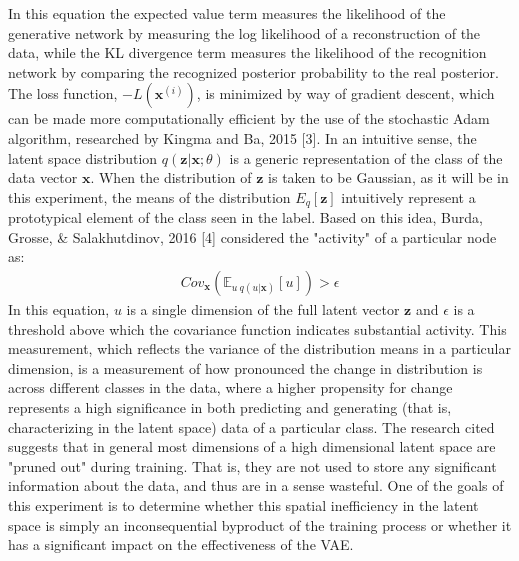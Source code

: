 \documentclass{article} %
\begin{document}
In this equation the expected value term measures the likelihood of the generative network by measuring the log likelihood of a reconstruction of the data, while the KL divergence term measures the likelihood of the recognition network by comparing the recognized posterior probability to the real posterior. The loss function, $-L(\textbf{x}^{(i)})$, is minimized by way of gradient descent, which can be made more computationally efficient by the use of the stochastic Adam algorithm, researched by Kingma and Ba, 2015 [3].
In an intuitive sense, the latent space distribution $q(\textbf{z}|\textbf{x};\theta)$ is a generic representation of the class of the data vector $\textbf{x}$. When the distribution of $\textbf{z}$ is taken to be Gaussian, as it will be in this experiment, the means of the distribution $E_{q}\left[\textbf{z}\right]$ intuitively represent a prototypical element of the class seen in the label. Based on this idea, Burda, Grosse, \& Salakhutdinov, 2016 [4] considered the "activity" of a particular node as:
\begin{align}
  Cov_{\textbf{x}}\left(\mathbb{E}_{u~q(u|\textbf{x})}[u]\right)>\epsilon
\end{align}
In this equation, $u$ is a single dimension of the full latent vector $\textbf{z}$ and $\epsilon$ is a threshold above which the covariance function indicates substantial activity. This measurement, which reflects the variance of the distribution means in a particular dimension, is a measurement of how pronounced the change in distribution is across different classes in the data, where a higher propensity for change represents a high significance in both predicting and generating (that is, characterizing in the latent space) data of a particular class. The research cited suggests that in general most dimensions of a high dimensional latent space are "pruned out" during training. That is, they are not used to store any significant information about the data, and thus are in a sense wasteful. One of the goals of this experiment is to determine whether this spatial inefficiency in the latent space is simply an inconsequential byproduct of the training process or whether it has a significant impact on the effectiveness of the VAE.
\end{document}
